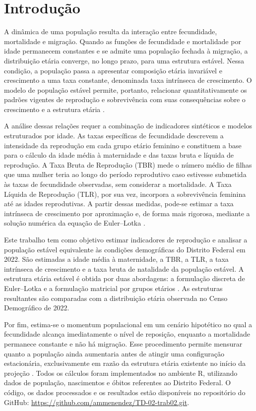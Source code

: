 \documentclass[a4paper,12pt]{article}
\begin{document}


\section{Introdução}

A dinâmica de uma população resulta da interação entre fecundidade, mortalidade e migração. Quando as funções de fecundidade e mortalidade por idade permanecem constantes e se admite uma população fechada à migração, a distribuição etária converge, no longo prazo, para uma estrutura estável. Nessa condição, a população passa a apresentar composição etária invariável e crescimento a uma taxa constante, denominada taxa intrínseca de crescimento. O modelo de população estável permite, portanto, relacionar quantitativamente os padrões vigentes de reprodução e sobrevivência com suas consequências sobre o crescimento e a estrutura etária \cite{grupofoz2021,preston2001}.

A análise dessas relações requer a combinação de indicadores sintéticos e modelos estruturados por idade. As taxas específicas de fecundidade descrevem a intensidade da reprodução em cada grupo etário feminino e constituem a base para o cálculo da idade média à maternidade e das taxas bruta e líquida de reprodução. A Taxa Bruta de Reprodução (TBR) mede o número médio de filhas que uma mulher teria ao longo do período reprodutivo caso estivesse submetida às taxas de fecundidade observadas, sem considerar a mortalidade. A Taxa Líquida de Reprodução (TLR), por sua vez, incorpora a sobrevivência feminina até as idades reprodutivas. A partir dessas medidas, pode-se estimar a taxa intrínseca de crescimento por aproximação e, de forma mais rigorosa, mediante a solução numérica da equação de Euler--Lotka \cite{grupofoz2021,preston2001}.

Este trabalho tem como objetivo estimar indicadores de reprodução e analisar a população estável equivalente às condições demográficas do Distrito Federal em 2022. São estimadas a idade média à maternidade, a TBR, a TLR, a taxa intrínseca de crescimento e a taxa bruta de natalidade da população estável. A estrutura etária estável é obtida por duas abordagens: a formulação discreta de Euler--Lotka e a formulação matricial por grupos etários \cite{grupofoz2021,preston2001}. As estruturas resultantes são comparadas com a distribuição etária observada no Censo Demográfico de 2022.

Por fim, estima-se o momentum populacional em um cenário hipotético no qual a fecundidade alcança 
imediatamente o nível de reposição, enquanto a mortalidade permanece constante e não há migração. 
Esse procedimento permite mensurar quanto a população ainda aumentaria antes de atingir uma 
configuração estacionária, exclusivamente em razão da estrutura etária existente no início da 
projeção \cite{grupofoz2021,preston2001}. Todos os cálculos foram implementados no ambiente R, 
utilizando dados de população, nascimentos e óbitos referentes ao Distrito Federal. O código, os 
dados processados e os resultados estão disponíveis no repositório 
do GitHub: \url{https://github.com/ammenendez/TD-02-trab02.git}.
\end{document}
